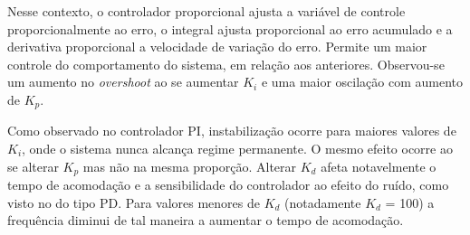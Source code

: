 
Nesse contexto, o controlador proporcional ajusta a variável de controle proporcionalmente ao erro, o integral ajusta proporcional ao erro acumulado e a derivativa proporcional a velocidade de variação do erro. Permite um maior controle do comportamento do sistema, em relação aos anteriores. Observou-se um aumento no \emph{overshoot} ao se aumentar $K_i$ e uma maior oscilação com aumento de $K_p$.

Como observado no controlador PI, instabilização ocorre para maiores valores de $K_i$, onde o sistema nunca alcança regime permanente. O mesmo efeito ocorre ao se alterar $K_p$ mas não na mesma proporção. Alterar $K_d$ afeta notavelmente o tempo de acomodação e a sensibilidade do controlador ao efeito do ruído, como visto no do tipo PD. Para valores menores de $K_d$ (notadamente $K_d$ = 100) a frequência diminui de tal maneira a aumentar o tempo de acomodação. 

